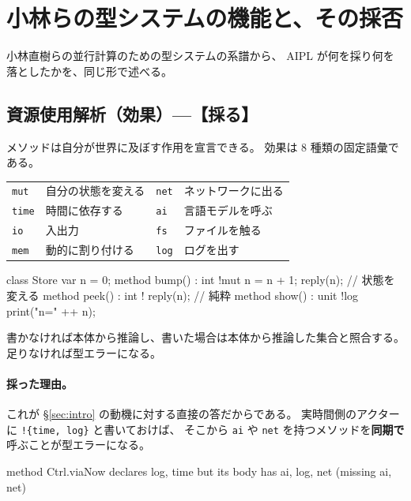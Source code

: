 \documentclass[11pt,a4paper]{ltjsarticle}
\theoremstyle{definition}
\theoremstyle{remark}
\begin{document}
\section{小林らの型システムの機能と、その採否}
\label{sec:koba}

小林直樹らの並行計算のための型システムの系譜から、
AIPL が何を採り何を落としたかを、同じ形で述べる。

\subsection{資源使用解析（効果）---【採る】}
\label{sec:eff}


メソッドは自分が世界に及ぼす作用を宣言できる。
効果は 8 種類の固定語彙である。

\begin{center}
\begin{tabular}{ll@{\qquad}ll}
\toprule
\texttt{mut}  & 自分の状態を変える    & \texttt{net} & ネットワークに出る \\
\texttt{time} & 時間に依存する        & \texttt{ai}  & 言語モデルを呼ぶ \\
\texttt{io}   & 入出力                & \texttt{fs}  & ファイルを触る \\
\texttt{mem}  & 動的に割り付ける      & \texttt{log} & ログを出す \\
\bottomrule
\end{tabular}
\end{center}

\begin{aipl}
class Store {
  var n = 0;
  method bump()  : int !{mut}  { n = n + 1; reply(n); }   // 状態を変える
  method peek()  : int !{}     { reply(n); }              // 純粋
  method show()  : unit !{log} { print("n=" ++ n); }
}
\end{aipl}

書かなければ本体から推論し、書いた場合は本体から推論した集合と照合する。
足りなければ型エラーになる。

\paragraph{採った理由。}
これが \S\ref{sec:intro} の動機に対する直接の答だからである。
実時間側のアクターに \texttt{!\{time, log\}} と書いておけば、
そこから \texttt{ai} や \texttt{net} を持つメソッドを\textbf{同期で}呼ぶことが型エラーになる。

\begin{term}
 method Ctrl.viaNow declares {log, time}
             but its body has {ai, log, net} (missing {ai, net})
\end{term}
\end{document}
